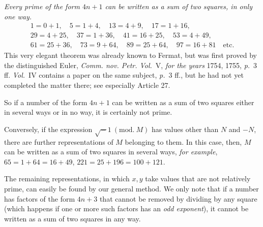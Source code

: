 \textit{Every prime of the form $4n+1$ can be written as a sum of two squares, in only one way.}
\[
\begin{gathered}
1=0+1,\quad5=1+4,\quad13=4+9,\quad17=1+16,\\
29=4+25,\quad37=1+36,\quad41=16+25,\quad53=4+49,\\
61=25+36,\quad73=9+64,\quad89=25+64,\quad97=16+81\quad\text{etc.}
\end{gathered}
\]
This very elegant theorem was already known to Fermat, but was first proved by the distinguished Euler, \textit{Comm. nov. Petr. Vol.}\ V, \textit{for the years} 1754, 1755, \textit{p.}\ 3 ff. \textit{Vol.}\ IV contains a paper on the same subject, \textit{p.}\ 3 ff., but he had not yet completed the matter there; see especially Article 27.

So if a number of the form $4n+1$ can be written as a sum of two squares either in several ways or in no way, it is certainly not prime.

Conversely, if the expression $\surd-1\ (\mathrm{mod.}\ M)$ has values other than $N$ and $-N$, there are further representations of $M$ belonging to them. In this case, then, $M$ can be written as a sum of two squares in several ways, \textit{for example}, $65=1+64=16+49$, $221=25+196=100+121$.

The remaining representations, in which $x,y$ take values that are not relatively prime, can easily be found by our general method. We only note that if a number has factors of the form $4n+3$ that cannot be removed by dividing by any square (which happens if one or more such factors has an \textit{odd exponent}), it cannot be written as a sum of two squares in any way.

